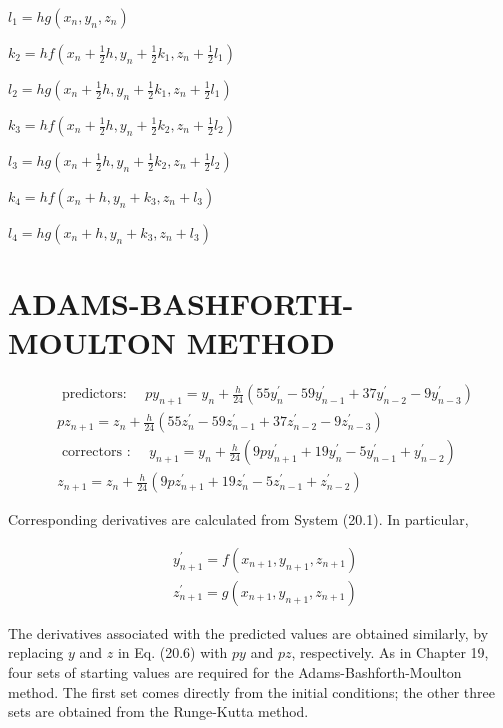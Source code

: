 \documentclass[10pt]{article}
\begin{document}
$l_{1}=h g\left(x_{n}, y_{n}, z_{n}\right)$

$k_{2}=h f\left(x_{n}+\frac{1}{2} h, y_{n}+\frac{1}{2} k_{1}, z_{n}+\frac{1}{2} l_{1}\right)$

$l_{2}=h g\left(x_{n}+\frac{1}{2} h, y_{n}+\frac{1}{2} k_{1}, z_{n}+\frac{1}{2} l_{1}\right)$

$k_{3}=h f\left(x_{n}+\frac{1}{2} h, y_{n}+\frac{1}{2} k_{2}, z_{n}+\frac{1}{2} l_{2}\right)$

$l_{3}=h g\left(x_{n}+\frac{1}{2} h, y_{n}+\frac{1}{2} k_{2}, z_{n}+\frac{1}{2} l_{2}\right)$

$k_{4}=h f\left(x_{n}+h, y_{n}+k_{3}, z_{n}+l_{3}\right)$

$l_{4}=h g\left(x_{n}+h, y_{n}+k_{3}, z_{n}+l_{3}\right)$

\section*{ADAMS-BASHFORTH-MOULTON METHOD}
$$
\begin{aligned}
& \text { predictors: } \quad p y_{n+1}=y_{n}+\frac{h}{24}\left(55 y_{n}^{\prime}-59 y_{n-1}^{\prime}+37 y_{n-2}^{\prime}-9 y_{n-3}^{\prime}\right) \\
& p z_{n+1}=z_{n}+\frac{h}{24}\left(55 z_{n}^{\prime}-59 z_{n-1}^{\prime}+37 z_{n-2}^{\prime}-9 z_{n-3}^{\prime}\right) \\
& \text { correctors : } \quad y_{n+1}=y_{n}+\frac{h}{24}\left(9 p y_{n+1}^{\prime}+19 y_{n}^{\prime}-5 y_{n-1}^{\prime}+y_{n-2}^{\prime}\right) \\
& z_{n+1}=z_{n}+\frac{h}{24}\left(9 p z_{n+1}^{\prime}+19 z_{n}^{\prime}-5 z_{n-1}^{\prime}+z_{n-2}^{\prime}\right)
\end{aligned}
$$

Corresponding derivatives are calculated from System (20.1). In particular,


\begin{align*}
& y_{n+1}^{\prime}=f\left(x_{n+1}, y_{n+1}, z_{n+1}\right)  \tag{20.6}\\
& z_{n+1}^{\prime}=g\left(x_{n+1}, y_{n+1}, z_{n+1}\right)
\end{align*}


The derivatives associated with the predicted values are obtained similarly, by replacing $y$ and $z$ in Eq. (20.6) with $p y$ and $p z$, respectively. As in Chapter 19, four sets of starting values are required for the Adams-Bashforth-Moulton method. The first set comes directly from the initial conditions; the other three sets are obtained from the Runge-Kutta method.
\end{document}
